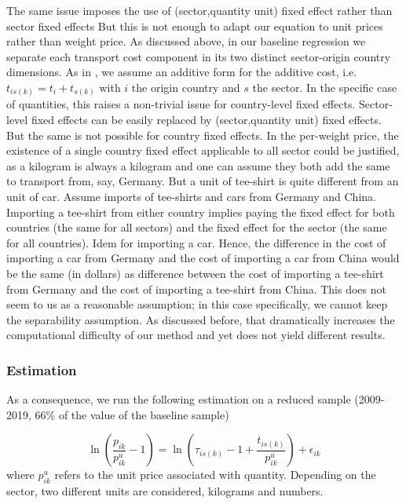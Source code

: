 \documentclass[a4paper,11pt]{article}
\begin{document}
The same issue imposes the use of (sector,quantity unit) fixed effect rather than sector fixed effects
But this is not enough to adapt our equation to unit prices rather than weight price.
As discussed above, in our baseline regression we separate each transport cost component in its two distinct sector-origin country dimensions.
As in \cite{Irrazabal_2015}, we assume an additive form for the additive cost, i.e. $t_{is(k)} = t_i+t_{s(k)}$ with $i$ the origin country and $s$ the sector.
In the specific case of quantities, this raises a non-trivial issue for country-level fixed effects.
Sector-level fixed effects can be easily replaced by (sector,quantity unit) fixed effects.
But the same is not possible for country fixed effects.
In the per-weight price, the existence of a single country fixed effect applicable to all sector could be justified, as a kilogram is always a kilogram and one can assume they both add the same to transport from, say, Germany.
But a unit of tee-shirt is quite different from an unit of car.
Assume imports of tee-shirts and cars from Germany and China.
Importing a tee-shirt from either country implies paying the fixed effect for both countries (the same for all sectors) and the fixed effect for the sector (the same for all countries).
Idem for importing a car.
Hence, the difference in the cost of importing a car from Germany and the cost of importing a car from China would be the same (in dollars) as difference between the cost of importing a tee-shirt from Germany and the cost of importing a tee-shirt from China.
This does not seem to us as a reasonable assumption; in this case specifically, we cannot keep the separability assumption.
As discussed before, that dramatically increases the computational difficulty of our method and yet does not yield different results.

\subsubsection{Estimation}

As a consequence, we run the following estimation on a reduced sample (2009-2019, 66\% of the value of the baseline sample)

\begin{equation}
\ln\left(\frac{p_{ik}}{p^u_{ik}}-1 \right)= \ln \left(\tau_{is(k)} -1+\frac{t_{is(k)} }{p^u_{ik}} \right) + \epsilon_{ik} \label{eq:model_IetA}
\end{equation}
\noindent where $p^u_{ik}$ refers to the unit price associated with quantity. Depending on the sector, two different units are considered, kilograms and numbers.
\end{document}
